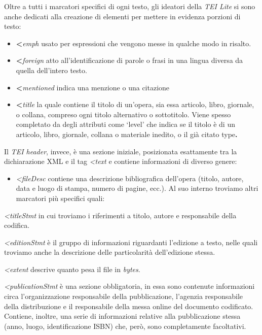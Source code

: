 Oltre a tutti i marcatori specifici di ogni testo, gli ideatori della
\emph{TEI Lite} si sono anche dedicati alla creazione di elementi per
mettere in evidenza porzioni di testo:

\begin{itemize}
\item
  \textbf{\textless{}}\emph{emph}\textbf{} usato per
  espressioni che vengono messe in qualche modo in risalto.
\item
  \textbf{\textless{}}\emph{foreign}\textbf{} atto
  all'identificazione di parole o frasi in una lingua diversa da quella
  dell'intero testo.
\item
  \textbf{\textless{}}\emph{mentioned}\textbf{} indica una
  menzione o una citazione
\item
  \textbf{\textless{}}\emph{title}\textbf{} la quale
  contiene il titolo di un'opera, sia essa articolo, libro, giornale, o
  collana, compreso ogni titolo alternativo o sottotitolo. Viene spesso
  completato da degli attributi come `level' che indica se il titolo è
  di un articolo, libro, giornale, collana o materiale inedito, o il già
  citato type\textbf{.}
\end{itemize}

Il \emph{TEI header}, invece, è una sezione iniziale, posizionata
esattamente tra la dichiarazione XML e il tag
\emph{\textless{}text} e contiene informazioni di diverso
genere:

\begin{itemize}
\item
  \emph{\textless{}fileDesc} contiene una descrizione
  bibliografica dell'opera (titolo, autore, data e luogo di stampa,
  numero di pagine, ecc.). Al suo interno troviamo altri marcatori più
  specifici quali:
\end{itemize}

\emph{\textless{}titleStmt} in cui troviamo i riferimenti
a titolo, autore e responsabile della codifica.

\emph{\textless{}editionStmt} è il gruppo di informazioni
riguardanti l'edizione a testo, nelle quali troviamo anche la
descrizione delle particolarità dell'edizione stessa.

\emph{\textless{}extent} descrive quanto pesa il file in
\emph{bytes}.

\emph{\textless{}publicationStmt} è una sezione
obbligatoria, in essa sono contenute informazioni circa l'organizzazione
responsabile della pubblicazione, l'agenzia responsabile della
distribuzione e il responsabile della messa online del documento
codificato. Contiene, inoltre, una serie di informazioni relative alla
pubblicazione stessa (anno, luogo, identificazione ISBN) che, però, sono
completamente facoltativi.

